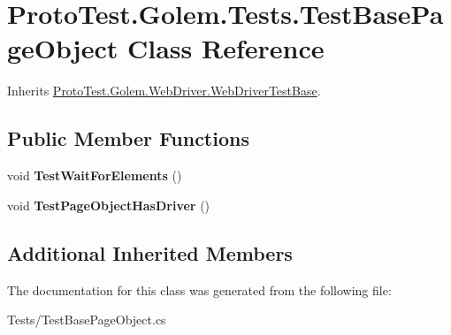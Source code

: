 \hypertarget{class_proto_test_1_1_golem_1_1_tests_1_1_test_base_page_object}{\section{Proto\-Test.\-Golem.\-Tests.\-Test\-Base\-Page\-Object Class Reference}
\label{class_proto_test_1_1_golem_1_1_tests_1_1_test_base_page_object}
}


Inherits \hyperlink{class_proto_test_1_1_golem_1_1_web_driver_1_1_web_driver_test_base}{Proto\-Test.\-Golem.\-Web\-Driver.\-Web\-Driver\-Test\-Base}.

\subsection*{Public Member Functions}
\begin{DoxyCompactItemize}
\item 
\hypertarget{class_proto_test_1_1_golem_1_1_tests_1_1_test_base_page_object_ad662b2f6c3db59032f699598e0704ace}{void {\bfseries Test\-Wait\-For\-Elements} ()}\label{class_proto_test_1_1_golem_1_1_tests_1_1_test_base_page_object_ad662b2f6c3db59032f699598e0704ace}

\item 
\hypertarget{class_proto_test_1_1_golem_1_1_tests_1_1_test_base_page_object_a167593bcc6be5543b5968631b986c1ee}{void {\bfseries Test\-Page\-Object\-Has\-Driver} ()}\label{class_proto_test_1_1_golem_1_1_tests_1_1_test_base_page_object_a167593bcc6be5543b5968631b986c1ee}

\end{DoxyCompactItemize}
\subsection*{Additional Inherited Members}


The documentation for this class was generated from the following file\-:\begin{DoxyCompactItemize}
\item 
Tests/Test\-Base\-Page\-Object.\-cs\end{DoxyCompactItemize}
